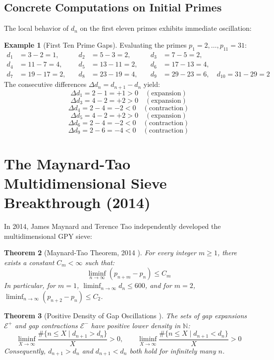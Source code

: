 \documentclass[11pt,a4paper]{article}
\newtheorem{theorem}{Theorem}[section]
\theoremstyle{definition}
\newtheorem{example}[theorem]{Example}
\begin{document}
\subsection{Concrete Computations on Initial Primes}
The local behavior of $d_n$ on the first eleven primes exhibits immediate oscillation:

\begin{example}[First Ten Prime Gaps]\label{ex:small_gaps}
Evaluating the primes $p_1 = 2, \dots, p_{11} = 31$:
\begin{align*}
d_1 &= 3 - 2 = 1, \quad &d_2 &= 5 - 3 = 2, \quad &d_3 &= 7 - 5 = 2, \\
d_4 &= 11 - 7 = 4, \quad &d_5 &= 13 - 11 = 2, \quad &d_6 &= 17 - 13 = 4, \\
d_7 &= 19 - 17 = 2, \quad &d_8 &= 23 - 19 = 4, \quad &d_9 &= 29 - 23 = 6, \quad d_{10} = 31 - 29 = 2
\end{align*}
The consecutive differences $\Delta d_n = d_{n+1} - d_n$ yield:
\[ \Delta d_1 = 2 - 1 = +1 > 0 \quad (\text{expansion}) \]
\[ \Delta d_3 = 4 - 2 = +2 > 0 \quad (\text{expansion}) \]
\[ \Delta d_4 = 2 - 4 = -2 < 0 \quad (\text{contraction}) \]
\[ \Delta d_5 = 4 - 2 = +2 > 0 \quad (\text{expansion}) \]
\[ \Delta d_6 = 2 - 4 = -2 < 0 \quad (\text{contraction}) \]
\[ \Delta d_9 = 2 - 6 = -4 < 0 \quad (\text{contraction}) \]
\end{example}

\section{The Maynard-Tao Multidimensional Sieve Breakthrough (2014)}

In 2014, James Maynard \cite{maynard2015} and Terence Tao independently developed the multidimensional GPY sieve:

\begin{theorem}[Maynard-Tao Theorem, 2014 \cite{maynard2015}]\label{thm:maynard_tao}
For every integer $m \ge 1$, there exists a constant $C_m < \infty$ such that:
\begin{equation}\label{eq:maynard_bound}
\liminf_{n \to \infty} (p_{n+m} - p_n) \le C_m
\end{equation}
In particular, for $m = 1$, $\liminf_{n \to \infty} d_n \le 600$, and for $m = 2$, $\liminf_{n \to \infty} (p_{n+2} - p_n) \le C_2$.
\end{theorem}

\begin{theorem}[Positive Density of Gap Oscillations \cite{maynard2015}]\label{thm:maynard_density}
The sets of gap expansions $\mathcal{E}^+$ and gap contractions $\mathcal{E}^-$ have positive lower density in $\mathbb{N}$:
\begin{equation}\label{eq:positive_density}
\liminf_{X \to \infty} \frac{\# \{ n \le X \mid d_{n+1} > d_n \}}{X} > 0, \qquad \liminf_{X \to \infty} \frac{\# \{ n \le X \mid d_{n+1} < d_n \}}{X} > 0
\end{equation}
Consequently, $d_{n+1} > d_n$ and $d_{n+1} < d_n$ both hold for infinitely many $n$.
\end{theorem}
\end{document}
